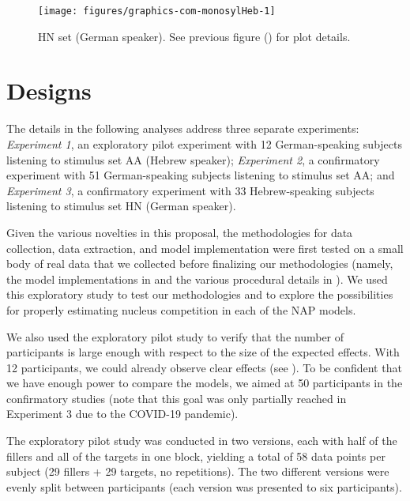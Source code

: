 \begin{figure}[p]
\texttt{[image: figures/graphics-com-monosylHeb-1]}
\caption{HN set (German speaker). See previous figure () for plot details.}\label{fig:com-monosylHeb}
\end{figure}

\clearpage
\section{Designs}\label{sec:designs}

The details in the following analyses address three separate experiments:
\emph{Experiment 1}, an exploratory pilot experiment with 12 German-speaking subjects listening to stimulus set AA (Hebrew speaker); \emph{Experiment 2}, a confirmatory experiment with 51 German-speaking subjects listening to stimulus set AA; and \emph{Experiment 3}, a confirmatory experiment with 33 Hebrew-speaking subjects listening to stimulus set HN (German speaker).

Given the various novelties in this proposal, the methodologies for data collection, data extraction, and model implementation were first tested on a small body of real data that we collected before finalizing our methodologies (namely, the model implementations in  and the various procedural details in ).
We used this exploratory study to test our methodologies and to explore the possibilities for properly estimating nucleus competition in each of the NAP models.

We also used the exploratory pilot study to verify that the number of participants is large enough with respect to the size of the expected effects. With 12 participants, we could already observe clear effects (see ). To be confident that we have enough power to compare the models, we aimed at 50 participants in the confirmatory studies (note that this goal was only partially reached in Experiment 3 due to the COVID-19 pandemic).

The exploratory pilot study was conducted in two versions, each with half of the fillers and all of the targets in one block, yielding a total of 58 data points per subject (29 fillers + 29 targets, no repetitions).
The two different versions were evenly split between participants (each version was presented to six participants).

